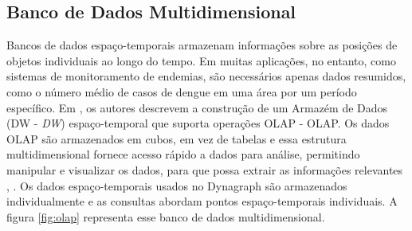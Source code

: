 \subsection{Banco de Dados Multidimensional}
Bancos de dados espaço-temporais armazenam informações sobre as posições de objetos individuais ao longo do tempo. Em muitas aplicações, no entanto, como sistemas de monitoramento de endemias, são necessários apenas dados resumidos, como o número médio de casos de dengue em uma área por um período específico.
Em , os autores descrevem a construção de um Armazém de Dados (\acrshort{DW} - \textit{\acrlong{DW}}) espaço-temporal que suporta operações \acrshort{OLAP} - \acrlong{OLAP}. Os dados \acrshort{OLAP} são armazenados em cubos, em vez de tabelas e essa estrutura multidimensional fornece acesso rápido a dados para análise, permitindo manipular e visualizar os dados, para que possa extrair as informações relevantes \cite{faghmous2013}, \cite{Mitsa:2010}. Os dados espaço-temporais usados no Dynagraph são armazenados individualmente e as consultas abordam pontos espaço-temporais individuais. A figura \ref{fig:olap} representa esse banco de dados multidimensional.

\begin{figure}[!ht]
	\centering	
\end{figure}
\FloatBarrier